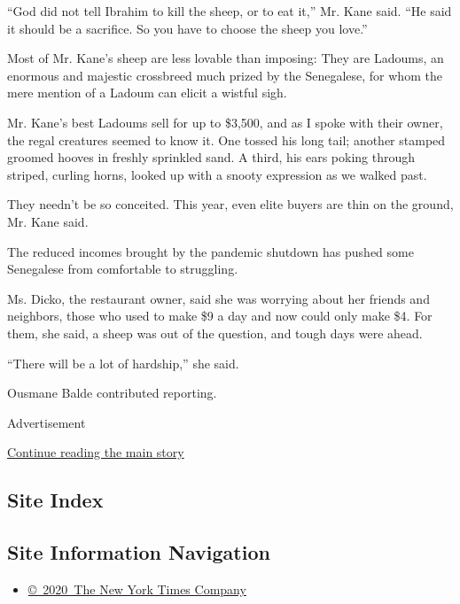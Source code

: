 ``God did not tell Ibrahim to kill the sheep, or to eat it,'' Mr. Kane
said. ``He said it should be a sacrifice. So you have to choose the
sheep you love.''

Most of Mr. Kane's sheep are less lovable than imposing: They are
Ladoums, an enormous and majestic crossbreed much prized by the
Senegalese, for whom the mere mention of a Ladoum can elicit a wistful
sigh.

Mr. Kane's best Ladoums sell for up to \$3,500, and as I spoke with
their owner, the regal creatures seemed to know it. One tossed his long
tail; another stamped groomed hooves in freshly sprinkled sand. A third,
his ears poking through striped, curling horns, looked up with a snooty
expression as we walked past.

They needn't be so conceited. This year, even elite buyers are thin on
the ground, Mr. Kane said.

The reduced incomes brought by the pandemic shutdown has pushed some
Senegalese from comfortable to struggling.

Ms. Dicko, the restaurant owner, said she was worrying about her friends
and neighbors, those who used to make \$9 a day and now could only make
\$4. For them, she said, a sheep was out of the question, and tough days
were ahead.

``There will be a lot of hardship,'' she said.

Ousmane Balde contributed reporting.

Advertisement

\protect\hyperlink{after-bottom}{Continue reading the main story}

\hypertarget{site-index}{%
\subsection{Site Index}\label{site-index}}

\hypertarget{site-information-navigation}{%
\subsection{Site Information
Navigation}\label{site-information-navigation}}

\begin{itemize}
\tightlist
\item
  \href{https://help.nytimes3xbfgragh.onion/hc/en-us/articles/115014792127-Copyright-notice}{©~2020~The
  New York Times Company}
\end{itemize}

